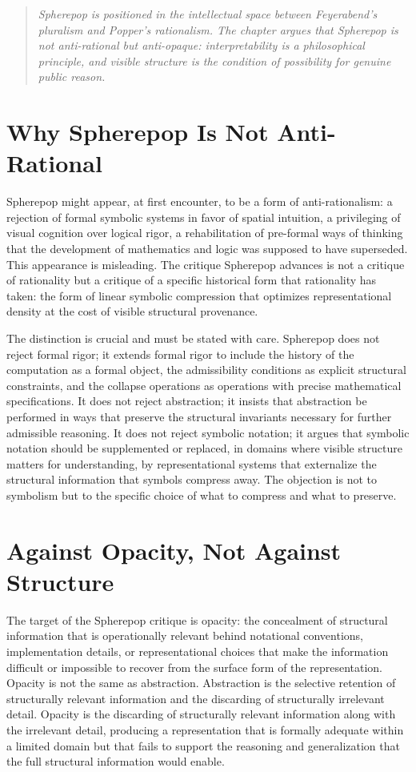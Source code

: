 \documentclass[12pt,openany]{book}
\theoremstyle{plain}
\theoremstyle{definition}
\theoremstyle{remark}
\newenvironment{chapterprecis}{%
  \begin{quote}\small\itshape}{%
  \end{quote}\medskip}
\begin{document}
\begin{chapterprecis}
Spherepop is positioned in the intellectual space between
Feyerabend's pluralism and Popper's rationalism. The chapter
argues that Spherepop is not anti-rational but anti-opaque:
interpretability is a philosophical principle, and visible
structure is the condition of possibility for genuine public
reason.
\end{chapterprecis}

\section{Why Spherepop Is Not Anti-Rational}

Spherepop might appear, at first encounter, to be a form of anti-rationalism: a rejection of formal symbolic systems in favor of spatial intuition, a privileging of visual cognition over logical rigor, a rehabilitation of pre-formal ways of thinking that the development of mathematics and logic was supposed to have superseded. This appearance is misleading. The critique Spherepop advances is not a critique of rationality but a critique of a specific historical form that rationality has taken: the form of linear symbolic compression that optimizes representational density at the cost of visible structural provenance.

The distinction is crucial and must be stated with care. Spherepop does not reject formal rigor; it extends formal rigor to include the history of the computation as a formal object, the admissibility conditions as explicit structural constraints, and the collapse operations as operations with precise mathematical specifications. It does not reject abstraction; it insists that abstraction be performed in ways that preserve the structural invariants necessary for further admissible reasoning. It does not reject symbolic notation; it argues that symbolic notation should be supplemented or replaced, in domains where visible structure matters for understanding, by representational systems that externalize the structural information that symbols compress away. The objection is not to symbolism but to the specific choice of what to compress and what to preserve.

\section{Against Opacity, Not Against Structure}

The target of the Spherepop critique is opacity: the concealment of structural information that is operationally relevant behind notational conventions, implementation details, or representational choices that make the information difficult or impossible to recover from the surface form of the representation. Opacity is not the same as abstraction. Abstraction is the selective retention of structurally relevant information and the discarding of structurally irrelevant detail. Opacity is the discarding of structurally relevant information along with the irrelevant detail, producing a representation that is formally adequate within a limited domain but that fails to support the reasoning and generalization that the full structural information would enable.
\end{document}
